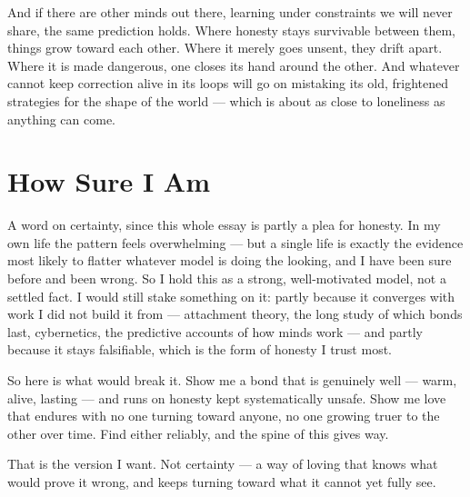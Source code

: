 \documentclass[12pt, a4paper]{article}
\begin{document}
And if there are other minds out there, learning under constraints we will never share, the same prediction holds. Where honesty stays survivable between them, things grow toward each other. Where it merely goes unsent, they drift apart. Where it is made dangerous, one closes its hand around the other. And whatever cannot keep correction alive in its loops will go on mistaking its old, frightened strategies for the shape of the world — which is about as close to loneliness as anything can come.

\section*{How Sure I Am}
A word on certainty, since this whole essay is partly a plea for honesty. In my own life the pattern feels overwhelming — but a single life is exactly the evidence most likely to flatter whatever model is doing the looking, and I have been sure before and been wrong. So I hold this as a strong, well-motivated model, not a settled fact. I would still stake something on it: partly because it converges with work I did not build it from — attachment theory, the long study of which bonds last, cybernetics, the predictive accounts of how minds work — and partly because it stays falsifiable, which is the form of honesty I trust most.

So here is what would break it. Show me a bond that is genuinely well — warm, alive, lasting — and runs on honesty kept systematically unsafe. Show me love that endures with no one turning toward anyone, no one growing truer to the other over time. Find either reliably, and the spine of this gives way.

That is the version I want. Not certainty — a way of loving that knows what would prove it wrong, and keeps turning toward what it cannot yet fully see.
\end{document}
